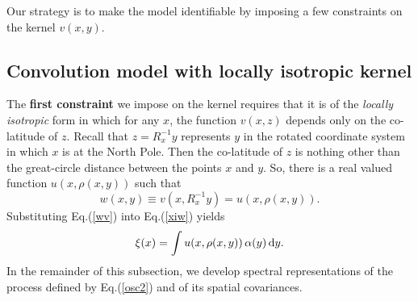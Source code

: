 \documentclass[12pt]{article}
\renewcommand{\d}{{\rm d}}
\begin{document}
Our strategy is to make the model identifiable by imposing a few
constraints on  the kernel  $v(x,y)$.





\subsection {Convolution model with locally isotropic kernel}
\label{sec_conv_loc_isotr}



The {\bf first constraint} we impose on the kernel requires that
it is of the {\em locally isotropic} form in which for any $x$, the function $v(x,z)$
depends only on the co-latitude of $z$. Recall that $z=R_x^{-1} y$ represents $y$ in the 
rotated coordinate system in which $x$ is at the North Pole. Then
the co-latitude of $z$ is nothing other than the great-circle distance between the points $x$ and $y$.
So, there is a real valued function  $u(x, \rho(x,y))$ such that
%
\begin {equation}
\label{wv}
w(x, y) \equiv v(x, R_x^{-1} y) = u(x, \rho(x,y)).
\end {equation}
%
Substituting  Eq.(\ref{wv}) into Eq.(\ref{xiw}) yields
%
\begin {equation}
\label{osc2}
\xi(x) = \int u(x, \rho(x,y)) \,\alpha(y) \,\d y. %
\end {equation}
%
In the remainder of this subsection, we develop spectral representations of the process 
defined by Eq.(\ref{osc2})
and of its spatial covariances.
\end{document}
